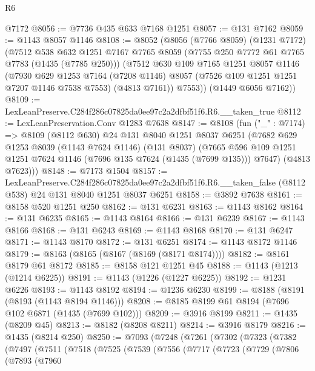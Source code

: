 \begin{lexlean}{R6}
\begin{coremodule}
    @7172
@8056 := @7736 @435 @633 @7168 @1251
@8057 := @131 @7162
@8059 := @1143 @8057 @1146
@8108 := @8052
    (@8056
      (@7766 @8059)
      (@1231 @7172)
      (@7512
        @538
        @632
        @1251
        @7167
        @7765
        @8059
        (@7755 @250 @7772 @61 @7765 @7783 (@1435 (@7785 @250)))
        (@7512
          @630
          @109
          @7165
          @1251
          @8057
          @1146
          (@7930
            @629
            @1253
            @7164
            (@7208 @1146)
            @8057
            (@7526 @109 @1251 @1251 @7207 @1146 @7538 @7553)
            (@4813 @7161))
          @7553))
      (@1449 @6056 @7162))
@8109 := LexLeanPreserve.C284f286c07825da0ee97c2a2dfbf51f6.R6.__taken_true
@8112 := LexLeanPreservation.Conv @1283 @7638
@8147 := @8108
    (fun ("_" : @7174) =>
    @8109
      (@8112 @630)
      @24
      @131
      @8040
      @1251
      @8037
      @6251
      (@7682
        @629
        @1253
        @8039
        (@1143 @7624 @1146)
        (@131 @8037)
        (@7665 @596 @109 @1251 @1251 @7624 @1146 (@7696 @135 @7624 (@1435 (@7699 @135))) @7647)
        (@4813 @7623)))
@8148 := @7173 @1504
@8157 := LexLeanPreserve.C284f286c07825da0ee97c2a2dfbf51f6.R6.__taken_false
    (@8112 @538)
    @24
    @131
    @8040
    @1251
    @8037
    @6251
@8158 := @3892 @7638
@8161 := @8158 @520 @1251 @250
@8162 := @131 @6231
@8163 := @1143 @8162
@8164 := @131 @6235
@8165 := @1143 @8164
@8166 := @131 @6239
@8167 := @1143 @8166
@8168 := @131 @6243
@8169 := @1143 @8168
@8170 := @131 @6247
@8171 := @1143 @8170
@8172 := @131 @6251
@8174 := @1143 @8172 @1146
@8179 := @8163 (@8165 (@8167 (@8169 (@8171 @8174))))
@8182 := @8161 @8179 @61 @8172
@8185 := @8158 @121 @1251 @45
@8188 := @1143 (@1213 (@1214 @6225))
@8191 := @1143 (@1226 (@1227 @6225))
@8192 := @1231 @6226
@8193 := @1143 @8192
@8194 := @1236 @6230
@8199 := @8188 (@8191 (@8193 (@1143 @8194 @1146)))
@8208 := @8185 @8199 @61 @8194 (@7696 @102 @6871 (@1435 (@7699 @102)))
@8209 := @3916 @8199
@8211 := @1435 (@8209 @45)
@8213 := @8182 (@8208 @8211)
@8214 := @3916 @8179
@8216 := @1435 (@8214 @250)
@8250 := @7093
    (@7248
      (@7261
        (@7302
          (@7323
            (@7382
              (@7497
                (@7511
                  (@7518
                    (@7525
                      (@7539
                        (@7556
                          (@7717
                            (@7723
                              (@7729
                                (@7806
                                  (@7893
                                    (@7960

\end{coremodule}
\end{lexlean}

